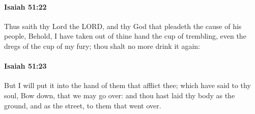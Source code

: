 		\paragraph{Isaiah 51:22} %
			\label{ISAIAH-51-22}

			Thus saith thy Lord the LORD, and thy God that pleadeth the cause of his people, Behold, I have taken out of thine hand the cup of trembling, even the dregs of the cup of my fury; thou shalt no more drink it again:


		\paragraph{Isaiah 51:23} %
			\label{ISAIAH-51-23}

			But I will put it into the hand of them that afflict thee; which have said to thy soul, Bow down, that we may go over: and thou hast laid thy body as the ground, and as the street, to them that went over.

